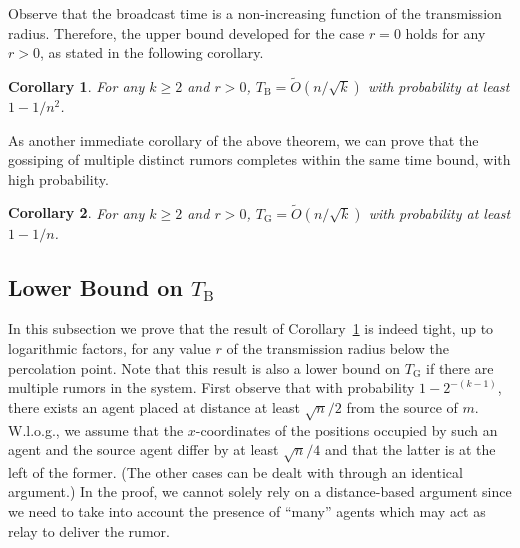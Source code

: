 \documentclass[11pt]{article}
\newcommand{\bigOt}[1]{\tilde{O}\left(#1\right)}
\newcommand{\bt}{T_{\mathrm{B}}}
\newcommand{\gt}{T_{\mathrm{G}}}
\newtheorem{coro}{Corollary}
\begin{document}
Observe that the broadcast time is a non-increasing function of the
transmission radius.  Therefore, the upper bound developed for the
case $r = 0$ holds for any $r > 0$, as stated in the following corollary.
\begin{coro}
\label{coro:monotone}
For any $k \geq 2$ and $r > 0$, $\bt = \bigOt{n/\sqrt{k}}$
with probability at least $1-1/n^2$.
\end{coro}

As another immediate corollary of the above theorem, we can prove that
the gossiping of multiple distinct rumors completes within the same
time bound, with high probability.
\begin{coro}
For any $k \geq 2$ and $r > 0$, $\gt = \bigOt{n/\sqrt{k}}$
with probability at least $1-1/n$.
\end{coro}

\subsection{Lower Bound on $\bt$}
\label{sec:gslb}

In this subsection we prove that the result of
Corollary~\ref{coro:monotone} is indeed tight, up to logarithmic
factors, for any value $r$ of the transmission radius below the
percolation point.  Note that this result is also a lower bound on
$\gt$ if there are multiple rumors in the system.  First observe that
with probability $1 - 2^{-(k-1)}$, there exists an agent placed at
distance at least $\sqrt{n}/2$ from the source of $m$.
W.l.o.g., we assume that the $x$-coordinates of the positions occupied
by such an agent and the source agent differ by at least $\sqrt{n}/4$
and that the latter is at the left of the former.  (The other cases
can be dealt with through an identical argument.)  In the proof, we
cannot solely rely on a distance-based argument since we need to take
into account the presence of ``many'' agents which may act as relay to
deliver the rumor.
\end{document}
